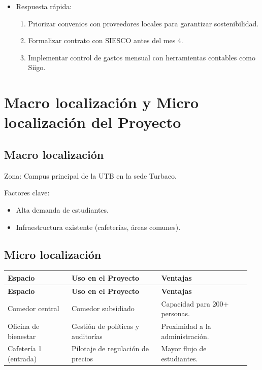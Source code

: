 \documentclass[letterpaper, 11pt]{report}
\begin{document}
\begin{enumerate}
\begin{itemize}
                  \item  Respuesta rápida: \begin{enumerate}
                              \item Priorizar convenios con proveedores locales para garantizar sostenibilidad.
                              \item Formalizar contrato con SIESCO antes del mes 4.
                              \item Implementar control de gastos mensual con herramientas contables como Siigo.
                        \end{enumerate}
            \end{itemize}
\end{enumerate}

\section{Macro localización y Micro localización del Proyecto}

\subsection{Macro localización}

Zona: Campus principal de la UTB en la sede Turbaco.

Factores clave: \begin{itemize}
      \item Alta demanda de estudiantes.
      \item Infraestructura existente (cafeterías, áreas comunes).

\end{itemize}

\subsection{Micro localización}

\begin{longtable}{|p{0.25\linewidth}|p{0.35\linewidth}|p{0.35\linewidth}|}
      \hline
      \textbf{Espacio}     & \textbf{Uso en el Proyecto}       & \textbf{Ventajas}             \\
      \hline
      \endfirsthead

      \hline
      \textbf{Espacio}     & \textbf{Uso en el Proyecto}       & \textbf{Ventajas}             \\
      \hline
      \endhead

      Comedor central      & Comedor subsidiado                & Capacidad para 200+ personas. \\ \hline
      Oficina de bienestar & Gestión de políticas y auditorías & Proximidad a la
      administración.                                                                          \\ \hline Cafetería 1 (entrada) & Pilotaje de regulación de
      precios              & Mayor flujo de estudiantes.                                       \\ \hline

\end{longtable}
\end{document}
